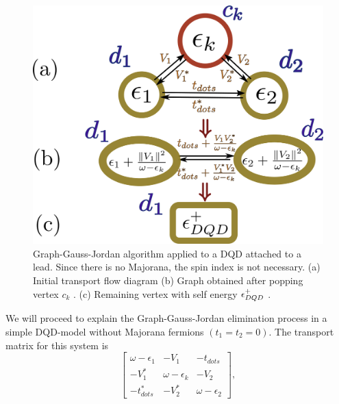 \documentclass[showpacs,aps,prb,reprint,superscriptaddress]{revtex4-1}
\begin{document}
        \begin{figure}[t]
        \begin{center}
        \includegraphics[scale=0.25]{Graficos/Graph_DQD-Pro.png}
        \caption{ Graph-Gauss-Jordan  algorithm applied  to  a DQD attached to a lead. Since there is no Majorana, the spin index is not necessary.  (a) Initial transport flow diagram  (b) Graph obtained after popping vertex $c_k$ .  (c) Remaining vertex with self energy $\epsilon^+_{DQD}$ .
        }
        \label{fig:GraphsDQD}
        \end{center}
        \end{figure}




We will proceed to explain the  Graph-Gauss-Jordan \cite{spielman_algorithms_2010} elimination  process  in a simple DQD-model without Majorana fermions $(t_1= t_2=0)$.  The transport matrix for this system is 
\begin{equation}
        \left[\begin{array}{ccc}
    \omega-\epsilon_{1} & -V_{1} & -t_{dots}\\
    -V_{1}^{*} & \omega-\epsilon_{k} & -V_{2}\\
    -t_{dots}^{*} & -V_{2}^{*} & \omega-\epsilon_{2}
    \end{array}\right], \label{eq:DQDMatrix}
\end{equation}
\end{document}
